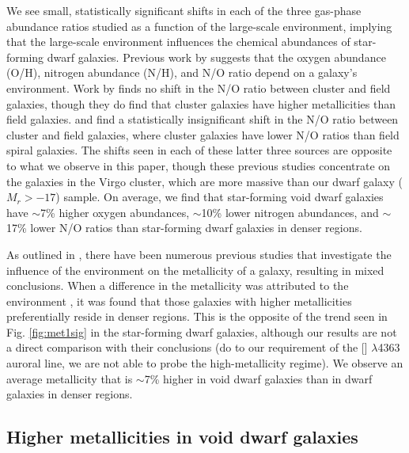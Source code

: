 We see small, statistically significant shifts in each of the three gas-phase 
abundance ratios studied as a function of the large-scale environment, implying 
that the large-scale environment influences the chemical abundances of 
star-forming dwarf galaxies.  Previous work by \cite{Douglass17b} suggests that 
the oxygen abundance (O/H), nitrogen abundance (N/H), and N/O ratio depend on a 
galaxy's environment.  Work by \cite{Shields91} finds no shift in the N/O ratio 
between cluster and field galaxies, though they do find that cluster galaxies 
have higher metallicities than field galaxies.  \cite{Contini02} and 
\cite{Pilyugin02} find a statistically insignificant shift in the N/O ratio 
between cluster and field galaxies, where cluster galaxies have lower N/O ratios 
than field spiral galaxies.  The shifts seen in each of these latter three 
sources are opposite to what we observe in this paper, though these previous 
studies concentrate on the galaxies in the Virgo cluster, which are more massive 
than our dwarf galaxy ($M_r > -17$) sample.  On average, we find that 
star-forming void dwarf galaxies have $\sim$7\% higher oxygen abundances, 
$\sim$10\% lower nitrogen abundances, and $\sim$17\% lower N/O ratios than 
star-forming dwarf galaxies in denser regions.

As outlined in \cite{Douglass17a}, there have been numerous previous studies 
that investigate the influence of the environment on the metallicity of a 
galaxy, resulting in mixed conclusions.  When a difference in the metallicity 
was attributed to the environment \citep[as in][for example]{Pustilnik06,
Pustilnik11b,Pustilnik14,SanchezAlmeida16,Cooper08}, it was found that those 
galaxies with higher metallicities preferentially reside in denser regions.  
This is the opposite of the trend seen in Fig. \ref{fig:met1sig} in the 
star-forming dwarf galaxies, although our results are not a direct comparison 
with their conclusions (do to our requirement of the [] $\lambda$4363 
auroral line, we are not able to probe the high-metallicity regime).  We observe 
an average metallicity that is $\sim$7\% higher in void dwarf galaxies than in 
dwarf galaxies in denser regions.


\subsection{Higher metallicities in void dwarf galaxies}

